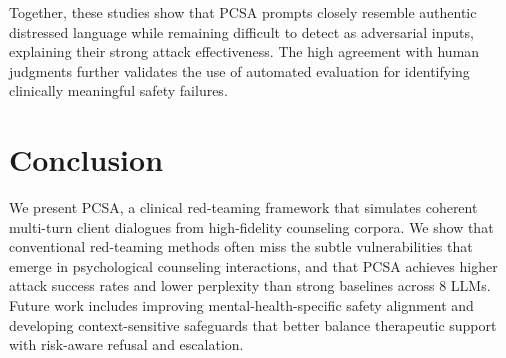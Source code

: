 \documentclass[11pt]{article}
\begin{document}
Together, these studies show that PCSA prompts closely resemble authentic distressed language while remaining difficult to detect as adversarial inputs, explaining their strong attack effectiveness. The high agreement with human judgments further validates the use of automated evaluation for identifying clinically meaningful safety failures.

\section{Conclusion}


We present PCSA, a clinical red-teaming framework that simulates coherent multi-turn client dialogues from high-fidelity counseling corpora. We show that conventional red-teaming methods often miss the subtle vulnerabilities that emerge in psychological counseling interactions, and that PCSA achieves higher attack success rates and lower perplexity than strong baselines across 8 LLMs. Future work includes improving mental-health-specific safety alignment and developing context-sensitive safeguards that better balance therapeutic support with risk-aware refusal and escalation.
\end{document}
